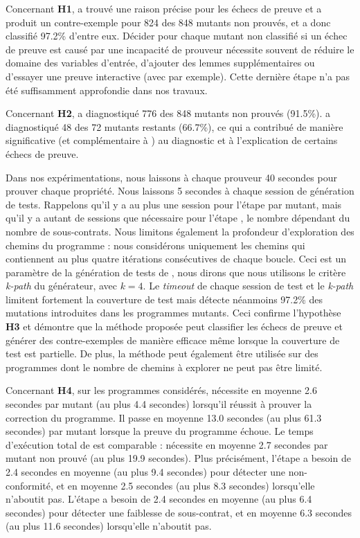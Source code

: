 Concernant \textbf{H1}, \stady a trouvé une raison précise pour les échecs de
preuve et a produit un contre-exemple pour 824 des 848 mutants non prouvés, et
a donc classifié 97.2\% d'entre eux.
Décider pour chaque mutant non classifié si un échec de preuve est causé par une
incapacité de prouveur nécessite souvent de réduire le domaine des variables
d'entrée, d'ajouter des lemmes supplémentaires ou d'essayer une preuve
interactive (avec \coq par exemple).
Cette dernière étape n'a pas été suffisamment approfondie dans nos travaux.

Concernant \textbf{H2}, \NCD a diagnostiqué 776 des 848 mutants non prouvés
(91.5\%).
\SWD a diagnostiqué 48 des 72 mutants restants (66.7\%), ce qui a contribué
de manière significative (et complémentaire à \NCD) au diagnostic et à
l'explication de certains échecs de preuve.

Dans nos expérimentations, nous laissons à chaque prouveur 40 secondes pour
prouver chaque propriété.
Nous laissons 5 secondes à chaque session de génération de tests.
Rappelons qu'il y a au plus une session pour l'étape \NCD par mutant, mais
qu'il y a autant de sessions que nécessaire pour l'étape \SWD, le nombre
dépendant du nombre de sous-contrats.
Nous limitons également la profondeur d'exploration des chemins du programme :
nous considérons uniquement les chemins qui contiennent au plus quatre
itérations consécutives de chaque boucle.
Ceci est un paramètre de la génération de tests de \pathcrawler, nous dirons
que nous utilisons le critère {\em k-path} du générateur, avec $k = 4$.
Le {\em timeout} de chaque session de test et le {\em k-path} limitent
fortement la couverture de test mais \stady détecte néanmoins 97.2\% des
mutations introduites dans les programmes mutants.
Ceci confirme l'hypothèse \textbf{H3} et démontre que la méthode proposée peut
classifier les échecs de preuve et générer des contre-exemples de manière
efficace même lorsque la couverture de test est partielle.
De plus, la méthode peut également être utilisée sur des programmes dont le
nombre de chemins à explorer ne peut pas être limité.

Concernant \textbf{H4}, sur les programmes considérés, \Wp nécessite en moyenne
2.6 secondes par mutant (au plus 4.4 secondes) lorsqu'il réussit à prouver la
correction du programme.
Il passe en moyenne 13.0 secondes (au plus 61.3 secondes) par mutant lorsque la
preuve du programme échoue.
Le temps d'exécution total de \stady est comparable : \stady nécessite en
moyenne 2.7 secondes par mutant non prouvé (au plus 19.9 secondes).
Plus précisément, l'étape \NCD a besoin de 2.4 secondes en moyenne (au plus 9.4
secondes) pour détecter une non-conformité, et en moyenne 2.5 secondes (au plus
8.3 secondes) lorsqu'elle n'aboutit pas.
L'étape \SWD a besoin de 2.4 secondes en moyenne (au plus 6.4 secondes) pour
détecter une faiblesse de sous-contrat, et en moyenne 6.3 secondes (au plus 11.6
secondes) lorsqu'elle n'aboutit pas.

